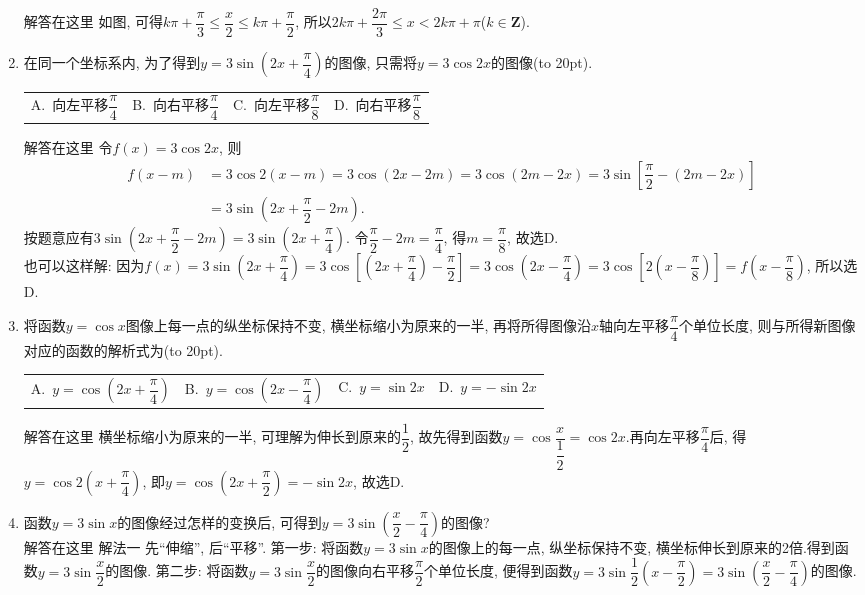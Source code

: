 \documentclass[10pt,a4paper]{article}
\newcommand{\bracket}[1]{(\hbox to #1pt{})}
\newcommand{\fourch}[4]{\par\begin{tabular}{p{.23\textwidth}p{.23\textwidth}p{.23\textwidth}p{.23\textwidth}}
A.~#1 &B.~#2& C.~#3& D.~#4
\end{tabular}}
\begin{document}
\begin{enumerate}[1.]
解答在这里  如图, 可得$k\pi +\dfrac{\pi}3\le \dfrac x2\le k\pi +\dfrac{\pi}2$,
所以$ 2k\pi +\dfrac{2\pi}3\le x<2k\pi +\pi$($k\in \mathbf{Z}$).
\begin{center}
\end{center}
\item 在同一个坐标系内, 为了得到$y=3\sin (2x+\dfrac{\pi}4)$的图像, 只需将$y=3\cos 2x$的图像\bracket{20}.
\fourch{向左平移$\dfrac{\pi}4$}{向右平移$\dfrac{\pi}4$}{向左平移$\dfrac{\pi}8$}{向右平移$\dfrac{\pi}8$}
解答在这里  令$f(x)=3\cos 2x$, 则
\begin{align*}f(x-m)&=3\cos 2(x-m)=3\cos (2x-2m)=3\cos (2m-2x)=3\sin [\dfrac{\pi}2-(2m-2x)] \\ &=3\sin (2x+\dfrac{\pi}2-2m).
\end{align*}
按题意应有$3\sin (2x+\dfrac{\pi}2-2m)=3\sin (2x+\dfrac{\pi}4)$.
令$\dfrac{\pi}2-2m=\dfrac{\pi}4$, 得$m=\dfrac{\pi}8$, 故选D.\\
也可以这样解:
因为$f(x)=3\sin (2x+\dfrac{\pi}4)=3\cos [(2x+\dfrac{\pi}4)-\dfrac{\pi}2]=3\cos (2x-\dfrac{\pi}4)=3\cos [2(x-\dfrac{\pi}8)]=f(x-\dfrac{\pi}8)$,
所以选D.
\item 将函数$y=\cos x$图像上每一点的纵坐标保持不变, 横坐标缩小为原来的一半, 再将所得图像沿$x$轴向左平移$\dfrac{\pi}4$个单位长度, 则与所得新图像对应的函数的解析式为\bracket{20}.
\fourch{$y=\cos (2x+\dfrac{\pi}4)$}{$y=\cos (2x-\dfrac{\pi}4)$}{$y=\sin 2x$}{$y=-\sin 2x$}
解答在这里  横坐标缩小为原来的一半, 可理解为伸长到原来的$\dfrac 12$, 故先得到函数$y=\cos \dfrac x{\dfrac 12}=\cos 2x$.再向左平移$\dfrac{\pi}4$后, 得$y=\cos 2(x+\dfrac{\pi}4)$, 即$y=\cos (2x+\dfrac{\pi}2)=-\sin 2x$, 故选D.
\item 函数$y=3\sin x$的图像经过怎样的变换后, 可得到$y=3\sin (\dfrac x2-\dfrac{\pi}4)$的图像?\\
解答在这里 解法一  先``伸缩'', 后``平移''.
第一步: 将函数$y=3\sin x$的图像上的每一点, 纵坐标保持不变, 横坐标伸长到原来的2倍.得到函数$y=3\sin \dfrac x2$的图像.
第二步: 将函数$y=3\sin \dfrac x2$的图像向右平移$\dfrac{\pi}2$个单位长度, 便得到函数$y=3\sin \dfrac 12(x-\dfrac{\pi}2)=3\sin (\dfrac x2-\dfrac{\pi}4)$的图像.\\

\end{enumerate}
\end{document}
